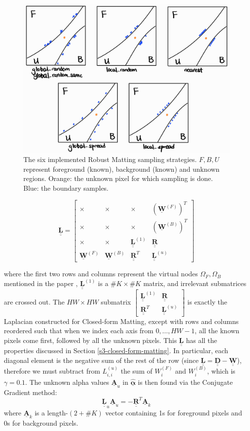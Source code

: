 \documentclass{article}
\theoremstyle{definition}
\def\vt#1{\underline{\mathbf{#1}}}
\def\vts#1{\underline{\boldsymbol{#1}}}
\def\mt#1{\underline{\underline{\mathbf{#1}}}}
\begin{document}
\begin{multicols}{2}[]
\begin{figure}[H]
    \centering
    \includegraphics[width=0.75\linewidth]{sampling}
    \caption{The six implemented Robust Matting sampling strategies. $F,B,U$ represent foreground (known), background (known) and unknown regions. Orange: the unknown pixel for which sampling is done. Blue: the boundary samples.}
    \label{fig:sampling}
\end{figure}
$$\mt L = \left[\begin{smallmatrix}
    \times & \times & \times & \left(\vt W^{(F)}\right)^T \\
    \times & \times & \times & \left(\vt W^{(B)}\right)^T \\
    \times & \times & \mt L^{(1)} & \mt R \\
    \vt W^{(F)} & \vt W^{(B)} & \mt R^T & \mt L^{(u)}
\end{smallmatrix}\right]$$

where the first two rows and columns represent the virtual nodes $\Omega_F,\Omega_B$ mentioned in the paper \cite[\S4.3]{robust-matting}, $\mt L^{(1)}$ is a $\#K \times \#K$ matrix, and irrelevant submatrices are crossed out. The $HW\times HW$ submatrix $\left[\begin{smallmatrix}\mt L^{(1)} & \mt R \\ \mt R^T & \mt L^{(u)}\end{smallmatrix}\right]$ is exactly the Laplacian constructed for Closed-form Matting, except with rows and columns reordered such that when we index each axis from $0,\dots,HW-1$, all the known pixels come first, followed by all the unknown pixels. This $\mt L$ has all the properties discussed in Section \ref{s3-closed-form-matting}. In particular, each diagonal element is the negative sum of the rest of the row (since $\mt L = \mt D - \mt W$), therefore we must subtract from $L^{(u)}_{i,i}$ the sum of $W^{(F)}_i$ and $W^{(B)}_i$, which is $\gamma=0.1$. The unknown alpha values $\vt A_u$ in $\hat{\vts \alpha}$ is then found via the Conjugate Gradient method:
$$\mt L_u \vt A_u = -\mt R^T \vt A_k$$
where $\vt A_k$ is a length-$(2+\# K)$ vector containing 1s for foreground pixels and 0s for background pixels.



\end{multicols}
\end{document}
